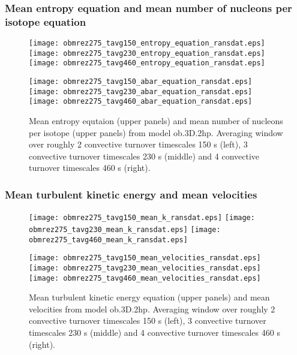 \documentclass[10pt,paper=a4]{report}
\begin{document}
\newpage

\subsubsection{Mean entropy equation and mean number of nucleons per isotope equation}

\begin{figure}[!h]
\centerline{
\texttt{[image: obmrez275\_tavg150\_entropy\_equation\_ransdat.eps]}
\texttt{[image: obmrez275\_tavg230\_entropy\_equation\_ransdat.eps]}
\texttt{[image: obmrez275\_tavg460\_entropy\_equation\_ransdat.eps]}}

\centerline{
\texttt{[image: obmrez275\_tavg150\_abar\_equation\_ransdat.eps]}
\texttt{[image: obmrez275\_tavg230\_abar\_equation\_ransdat.eps]}
\texttt{[image: obmrez275\_tavg460\_abar\_equation\_ransdat.eps]}}
\caption{Mean entropy equtaion (upper panels) and mean number of nucleons per isotope (upper panels) from model {\sf ob.3D.2hp}. Averaging window over roughly 2 convective turnover timescales 150 s (left), 3 convective turnover timescales 230 s (middle) and 4 convective turnover timescales 460 s (right).}
\end{figure}

\newpage

\subsubsection{Mean turbulent kinetic energy and mean velocities}

\begin{figure}[!h]
\centerline{
\texttt{[image: obmrez275\_tavg150\_mean\_k\_ransdat.eps]}
\texttt{[image: obmrez275\_tavg230\_mean\_k\_ransdat.eps]}
\texttt{[image: obmrez275\_tavg460\_mean\_k\_ransdat.eps]}}

\centerline{
\texttt{[image: obmrez275\_tavg150\_mean\_velocities\_ransdat.eps]}
\texttt{[image: obmrez275\_tavg230\_mean\_velocities\_ransdat.eps]}
\texttt{[image: obmrez275\_tavg460\_mean\_velocities\_ransdat.eps]}}
\caption{Mean turbulent kinetic energy equation (upper panels) and mean velocities from model {\sf ob.3D.2hp}. Averaging window over roughly 2 convective turnover timescales 150 s (left), 3 convective turnover timescales 230 s (middle) and 4 convective turnover timescales 460 s (right).}
\end{figure}


\newpage
\end{document}
